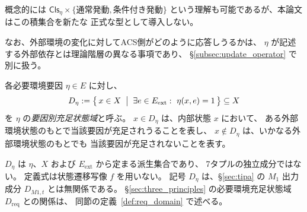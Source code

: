 \begin{remark}[必要環境要因の標準的粗分類候補]
概念的には
$\mathsf{Cls}_\eta\times\{\text{通常発動},\text{条件付き発動}\}$
という理解も可能であるが、本論文はこの積集合を新たな
正式な型として導入しない。

なお、外部環境の変化に対してACS側がどのように応答しうるかは、
$\eta$ が記述する外部依存とは理論階層の異なる事項であり、
\S\ref{subsec:update_operator} で別に扱う。
\end{remark}

\begin{definition}
\label{def:eta_satisfiable_domain}
各必要環境要因 $\eta\in E$ に対し、
\[
  D_\eta
  :=
  \bigl\{\,
    x\in X
    \;\bigm|\;
    \exists e\in E_{\mathrm{ext}}:\ \eta(x,e)=1
  \,\bigr\}
  \subseteq X
\]
を $\eta$ の\emph{要因別充足状態域}と呼ぶ。
$x\in D_\eta$ は、内部状態 $x$ において、
ある外部環境状態のもとで当該要因が充足されうることを表し、
$x\notin D_\eta$ は、いかなる外部環境状態のもとでも
当該要因が充足されないことを表す。

$D_\eta$ は $\eta$、$X$ および $E_{\mathrm{ext}}$ から定まる派生集合であり、
7タプルの独立成分ではない。
定義式は状態遷移写像 $f$ を用いない。
記号 $D_\eta$ は、\S\ref{sec:tipa} の $M_1$ 出力成分 $D_{M1,t}$ とは無関係である。
\S\ref{sec:three_principles} の必要環境充足状態域 $D_{\mathrm{req}}$ との関係は、
同節の定義~\ref{def:req_domain} で述べる。
\end{definition}


